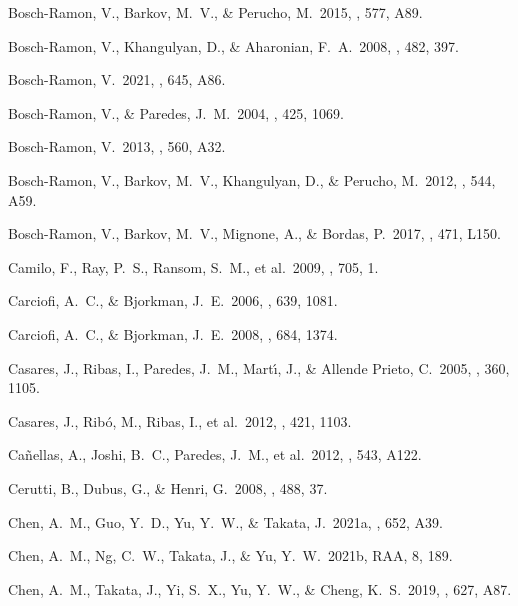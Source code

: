 \documentclass{aa}
\begin{document}
\begin{thebibliography}{}
 Bosch-Ramon, V., Barkov, M.~V., \& Perucho, M.\ 2015, \aap, 577, A89.

 Bosch-Ramon, V., Khangulyan, D., \& Aharonian, F.~A.\ 2008, \aap, 482, 397.

 Bosch-Ramon, V.\ 2021, \aap, 645, A86.

 Bosch-Ramon, V., \& Paredes, J.~M.\ 2004, \aap, 425, 1069.

 Bosch-Ramon, V.\ 2013, \aap, 560, A32.

 Bosch-Ramon, V., Barkov, M.~V., Khangulyan, D., \& Perucho, M.\ 2012, \aap, 544, A59.

 Bosch-Ramon, V., Barkov, M.~V., Mignone, A., \& Bordas, P.\ 2017, \mnras, 471, L150.

 Camilo, F., Ray, P.~S., Ransom, S.~M., et al.\ 2009, \apj, 705, 1.

 Carciofi, A.~C., \& Bjorkman, J.~E.\ 2006, \apj, 639, 1081.

 Carciofi, A.~C., \& Bjorkman, J.~E.\ 2008, \apj, 684, 1374.

 Casares, J., Ribas, I., Paredes, J.~M., Mart{\'\i}, J., \& Allende Prieto, C.\ 2005, \mnras, 360, 1105.

 Casares, J., Rib{\'o}, M., Ribas, I., et al.\ 2012, \mnras, 421, 1103.

 Ca{\~n}ellas, A., Joshi, B.~C., Paredes, J.~M., et al.\ 2012, \aap, 543, A122.

 Cerutti, B., Dubus, G., \& Henri, G.\ 2008, \aap, 488, 37.

 Chen, A.~M., Guo, Y.~D., Yu, Y.~W., \& Takata, J.\ 2021a, \aap, 652, A39.

 Chen, A.~M., Ng, C.~W., Takata, J., \& Yu, Y.~W.\ 2021b, RAA, 8, 189.

 Chen, A.~M., Takata, J., Yi, S.~X., Yu, Y.~W., \& Cheng, K.~S.\ 2019, \aap, 627, A87.


\end{thebibliography}
\end{document}
